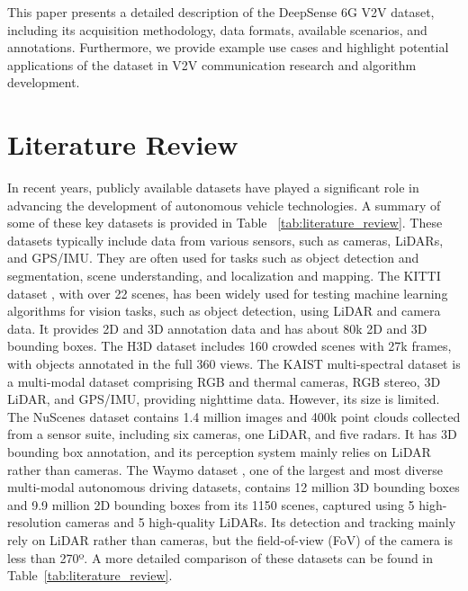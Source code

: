 \documentclass[10pt,comsoc]{IEEEtran}
\begin{document}
This paper presents a detailed description of the DeepSense 6G V2V dataset, including its acquisition methodology, data formats, available scenarios, and annotations. Furthermore, we provide example use cases and highlight potential applications of the dataset in V2V communication research and algorithm development.


\section{Literature Review} \label{sec:Literature}

In recent years, publicly available datasets \cite{Brostow_CamVid_2008, Geiger_KITTI, cordts2016cityscapes, yu2018bdd100k, huang2019apolloscape, ma2019trafficpredict, patil2019h3d, chang2019argoverse, caesar2020nuscenes, llc2019waymo, pham20203d, wang2021rethinking, yu2022dair, choi2018kaist} have played a significant role in advancing the development of autonomous vehicle technologies. A summary of some of these key datasets is provided in Table ~\ref{tab:literature_review}. These datasets typically include data from various sensors, such as cameras, LiDARs, and GPS/IMU. They are often used for tasks such as object detection and segmentation, scene understanding, and localization and mapping. The KITTI dataset \cite{Geiger_KITTI}, with over 22 scenes, has been widely used for testing machine learning algorithms for vision tasks, such as object detection, using LiDAR and camera data. It provides 2D and 3D annotation data and has about 80k 2D and 3D bounding boxes. The H3D dataset \cite{patil2019h3d} includes 160 crowded scenes with 27k frames, with objects annotated in the full 360 views. The KAIST multi-spectral dataset \cite{choi2018kaist} is a multi-modal dataset comprising RGB and thermal cameras, RGB stereo, 3D LiDAR, and GPS/IMU, providing nighttime data. However, its size is limited. The NuScenes dataset \cite{caesar2020nuscenes} contains 1.4 million images and 400k point clouds collected from a sensor suite, including six cameras, one LiDAR, and five radars. It has 3D bounding box annotation, and its perception system mainly relies on LiDAR rather than cameras. The Waymo dataset \cite{llc2019waymo}, one of the largest and most diverse multi-modal autonomous driving datasets, contains 12 million 3D bounding boxes and 9.9 million 2D bounding boxes from its 1150 scenes, captured using 5 high-resolution cameras and 5 high-quality LiDARs. Its detection and tracking mainly rely on LiDAR rather than cameras, but the field-of-view (FoV) of the camera is less than 270º. A more detailed comparison of these datasets can be found in Table~\ref{tab:literature_review}.
\end{document}

